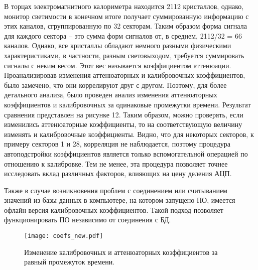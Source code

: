   В торцах электромагнитного калориметра находится 2112 кристаллов, однако, монитор светимости в конечном итоге получает суммированную информацию с этих каналов, сгруппированную по 32 секторам. Таким образом форма сигнала для каждого сектора -- это сумма форм сигналов от, в среднем, 2112/32 = 66 каналов. Однако, все кристаллы обладают немного разными физическими характеристиками, в частности, разным световыходом, требуется суммировать сигналы с неким весом. Этот вес называется коэффициентом аттенюации. Проанализировав изменения аттенюаторных и калибровочных коэффициентов, было замечено, что они коррелируют друг с другом. Поэтому, для более детального анализа, было проведен анализ изменения аттенюаторных коэффициентов и калибровочных за одинаковые промежутки времени. Результат сравнения представлен на рисунке 12. Таким образом, можно проверять, если изменились аттенюаторные коэффициенты, то на соответствующую величину изменять и калибровочные коэффициенты. Видно, что для некоторых секторов, к примеру секторов 1 и 28, корреляция не наблюдается, поэтому процедура автоподстройки коэффициентов является только вспомогательной операцией по отношению к калибровке. Тем не менее, эта процедура позволяет точнее исследовать вклад различных факторов, влияющих на цену деления АЦП.\par
  Также в случае возникновения проблем с соединением или считыванием значений из базы данных в компьютере, на котором запущено ПО, имеется офлайн версия калибровочных коэффициентов. Такой подход позволяет функционировать ПО независимо от соединения с БД.
\begin{figure}[htp]
  \centering
  \texttt{[image: coefs\_new.pdf]}
  \caption{Изменение калибровочных и аттенюаторных коэффициентов за равный промежуток времени.}
  \label{fig:galaxy}
\end{figure}

